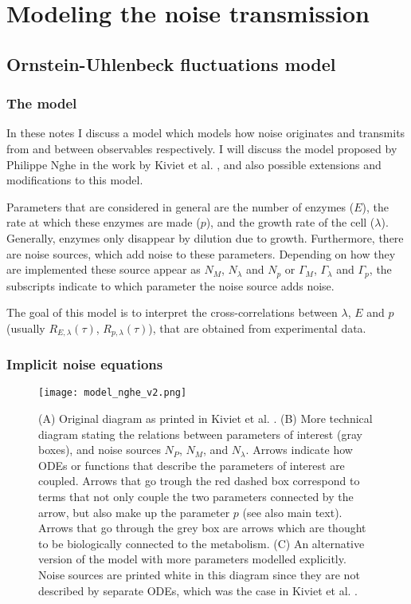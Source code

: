 

\chapter{Modeling the noise transmission}

\section{Ornstein-Uhlenbeck fluctuations model}

\subsection{The model}

In these notes I discuss a model which models how noise originates and transmits from and between observables respectively. I will discuss the model proposed by Philippe Nghe in the work by Kiviet et al. \cite{Kiviet2014}, and also possible extensions and modifications to this model.

Parameters that are considered in general are the number of enzymes ($E$), the rate at which these enzymes are made ($p$), and the growth rate of the cell ($\lambda$). Generally, enzymes only disappear by dilution due to growth. Furthermore, there are noise sources, which add noise to these parameters. Depending on how they are implemented these source appear as $N_M$, $N_\lambda$ and $N_p$ or $\Gamma_M$, $\Gamma_\lambda$ and $\Gamma_p$, the subscripts indicate to which parameter the noise source adds noise.

The goal of this model is to interpret the cross-correlations between $\lambda$, $E$ and $p$ (usually $R_{E,\lambda}(\tau)$, $R_{p,\lambda}(\tau)$), that are obtained from experimental data.

\subsection{Implicit noise equations}


\begin{figure}
	\centering
	\texttt{[image: model\_nghe\_v2.png]}
	\caption{ 
		(A) Original diagram as printed in Kiviet et al. \cite{Kiviet2014}.
		(B) More technical diagram stating the relations between parameters of interest (gray boxes), and noise sources $N_P$, $N_M$, and $N_\lambda$. Arrows indicate how ODEs or functions that describe the parameters of interest are coupled. 
		Arrows that go trough the red dashed box correspond to terms that not only couple the two parameters connected by the arrow, but also make up the parameter $p$ (see also main text).
		Arrows that go through the grey box are arrows which are thought to be biologically connected to the metabolism.
		(C) An alternative version of the model with more parameters modelled explicitly. Noise sources are printed white in this diagram since they are not described by separate ODEs, which was the case in Kiviet et al. \cite{Kiviet2014}. 
	}
	\label{fig:modeldrawing}
\end{figure}

